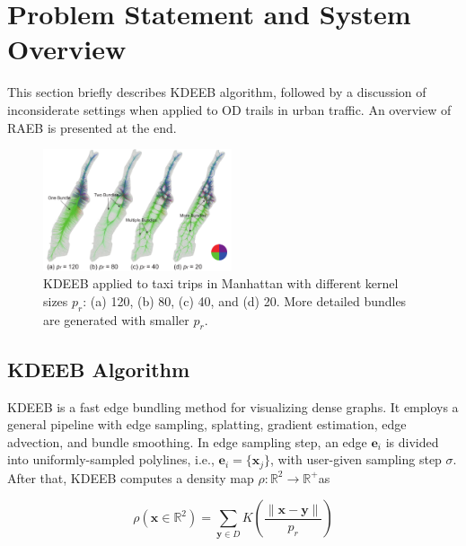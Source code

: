 \section{Problem Statement and System Overview}
\label{sec:overview}

This section briefly describes KDEEB algorithm, followed by a discussion of inconsiderate settings when applied to OD trails in urban traffic.
An overview of RAEB is presented at the end.

\begin{figure}[t] 
	\centering
	\includegraphics[width=0.495\textwidth]{figure/edgebundling/fig2_kernel_size/kernel_size}
	\vspace{-5mm}
	\caption{KDEEB applied to taxi trips in Manhattan with different kernel sizes $p_r$: (a) 120, (b) 80, (c) 40, and (d) 20.
	More detailed bundles are generated with smaller $p_r$.}
	\label{fig:kernel_size}
	\vspace{-5mm}
\end{figure}


\subsection{KDEEB Algorithm}
\label{ssec:kdeeb}
KDEEB is a fast edge bundling method for visualizing dense graphs.
It employs a general pipeline with edge sampling, splatting, gradient estimation, edge advection, and bundle smoothing.
In edge sampling step, an edge $\textbf{e}_i$ is divided into uniformly-sampled polylines, i.e., $\textbf{e}_i = \{\textbf{x}_j\}$, with user-given sampling step $\sigma$.
After that, KDEEB computes a density map $\rho : \mathbb{R}^2 \rightarrow \mathbb{R}^+ $as

\vspace{-4mm}
\begin{equation}\label{eq:kernel_density_estimation}
\rho(\textbf{x} \in \mathbb{R}^2) = \sum_{\textbf{y} \in D} K (\frac{\|\textbf{x}-\textbf{y}\|}{p_r})
\end{equation}

